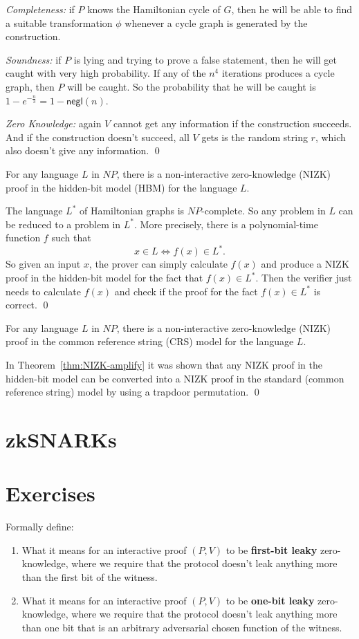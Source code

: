 \documentclass[12pt]{tufte-book}
\begin{document}
\textit{Completeness:} if $P$ knows the Hamiltonian cycle of $G$,
then he will be able to find a suitable transformation $\phi$ whenever a cycle graph is
generated by the construction.

\textit{Soundness:} if $P$ is lying and trying to prove a false statement, then he will
get caught with very high probability. If any of the $n^4$ iterations produces a cycle
graph, then $P$ will be caught. So the probability that he will be caught is
$1-e^{-\frac{n}{3}} = 1-\mathsf{negl}(n)$.

\textit{Zero Knowledge:} again $V$ cannot get any information if the construction succeeds.
And if the construction doesn't succeed, all $V$ gets is the random string $r$, which also
doesn't give any information.
\qed


\begin{theorem}
For any language $L$ in $NP$, there is a non-interactive zero-knowledge (NIZK) proof
in the hidden-bit model (HBM) for the language $L$.
\end{theorem}
\proof
The language $L^*$ of Hamiltonian graphs is $NP$-complete. So any problem in $L$ can
be reduced to a problem in $L^*$. More precisely, there is a polynomial-time function
$f$ such that
$$x\in L \Longleftrightarrow f(x)\in L^*.$$
So given an input $x$, the prover can simply calculate $f(x)$ and
produce a NIZK proof in the hidden-bit model for the fact that $f(x)\in L^*$.
Then the verifier just needs to calculate $f(x)$ and check if the proof for the fact
$f(x)\in L^*$ is correct.
\qed

\begin{theorem}\label{the:NIZK_NP}
For any language $L$ in $NP$, there is a non-interactive zero-knowledge (NIZK) proof
in the common reference string (CRS) model for the language $L$.
\end{theorem}
\proof
In Theorem~\ref{thm:NIZK-amplify} it was shown that any NIZK proof in the hidden-bit model can
be converted into a NIZK proof in the standard (common reference string) model by using
a trapdoor permutation.
\qed
 \section{zkSNARKs} \section*{Exercises}
\begin{exercise} Formally define:
\begin{enumerate}
  \item 
What it means for an  interactive proof $(P,V)$ to be \textbf{first-bit leaky} zero-knowledge, where we require that the protocol doesn't leak anything more than the first bit of the witness.

\item What it means for an  interactive proof $(P,V)$ to be \textbf{one-bit leaky} zero-knowledge, where we require that the protocol doesn't leak anything more than one bit that is an arbitrary adversarial chosen function of the witness.
    \end{enumerate}
\end{exercise}
\end{document}
